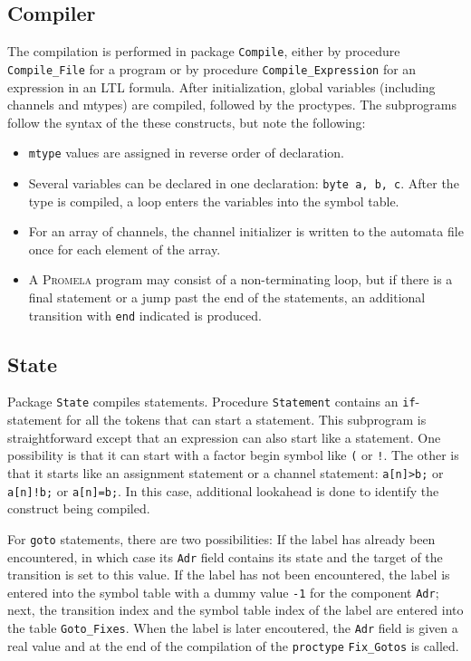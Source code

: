 \documentclass[11pt]{article}
\newcommand*{\prm}{\textsc{Promela}}
\newcommand*{\p}[1]{\texttt{#1}}
\begin{document}
\subsection{Compiler}

The compilation is performed in package \p{Compile}, either by procedure
\p{Compile\_File} for a program or by procedure \p{Compile\_Expression}
for an expression in an LTL formula. After initialization, global
variables (including channels and mtypes) are compiled, followed by the
proctypes. The subprograms follow the syntax of the these constructs,
but note the following:

\pagebreak[3]

\begin{itemize}
\item \p{mtype} values are assigned in reverse order of declaration.
\item Several variables can be declared in one declaration: \p{byte a,
b, c}. After the type is compiled, a loop enters the variables into the
symbol table.
\item For an array of channels, the channel initializer is written to
the automata file once for each element of the array.
\item A \prm{} program may consist of a non-terminating loop, but if
there is a final statement or a jump past the end of the statements, an
additional transition with \p{end} indicated is produced.
\end{itemize}

\subsection{State}

Package \p{State} compiles statements. Procedure \p{Statement} contains
an \p{if}-statement for all the tokens that can start a statement. This
subprogram is straightforward except that an expression can also start
like a statement. One possibility is that it can start with a factor
begin symbol like \p{(} or \p{!}. The other is that it starts like an
assignment statement or a channel statement: \p{a[n]>b;} or \p{a[n]!b;}
or \p{a[n]=b;}. In this case, additional lookahead is done to identify
the construct being compiled.

For \p{goto} statements, there are two possibilities: If the label has
already been encountered, in which case its \p{Adr} field contains its
state and the target of the transition is set to this value. If the
label has not been encountered, the label is entered into the symbol
table with a dummy value \p{-1} for the component \p{Adr}; next, the
transition index and the symbol table index of the label are entered into
the table \p{Goto\_Fixes}. When the label is later encoutered, the
\p{Adr} field is given a real value and at the end of the compilation
of the \p{proctype} \p{Fix\_Gotos} is called.
\end{document}
